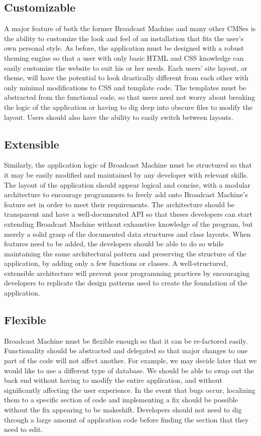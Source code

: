 \documentclass[a4paper,12pt]{report}
\begin{document}
\subsection{Customizable} 
A major feature of both the former Broadcast Machine and many other CMSes is the ability to customize the look and feel of an installation that fits the user's own personal style. 
As before, the application must be designed with a robust theming engine so that a user with only basic HTML and CSS knowledge can easily customize the website to suit his or her needs. 
Each users' site layout, or theme, will have the potential to look drastically different from each other with only minimal modifications to CSS and template code. 
The templates must be abstracted from the functional code, so that users need not worry about breaking the logic of the application or having to dig deep into obscure files to modify the layout. 
Users should also have the ability to easily switch between layouts. 


\subsection{Extensible} 
Similarly, the application logic of Broadcast Machine must be structured so that it may be easily modified and maintained by any developer with relevant skills. 
The layout of the application should appear logical and concise, with a modular architecture to encourage programmers to freely add onto Broadcast Machine's feature set in order to meet their requirements.
The architecture should be transparent and have a well-documented API so that theses developers can start extending Broadcast Machine without exhaustive knowledge of the program, but merely a solid grasp of the documented data structures and class layouts. 
When features need to be added, the developers should be able to do so while maintaining the same architectural pattern and preserving the structure of the application, by adding only a few functions or classes. 
A well-structured, extensible architecture will prevent poor programming practices by encouraging developers to replicate the design patterns used to create the foundation of the application.


\subsection{Flexible}
Broadcast Machine must be flexible enough so that it can be re-factored easily. 
Functionality should be abstracted and delegated so that major changes to one part of the code will not affect another. 
For example, we may decide later that we would like to use a different type of database. 
We should be able to swap out the back end without having to modify the entire application, and without significantly affecting the user experience. 
In the event that bugs occur, localizing them to a specific section of code and implementing a fix should be possible without the fix appearing to be makeshift. 
Developers should not need to dig through a large amount of application code before finding the section that they need to edit. 
\end{document}
